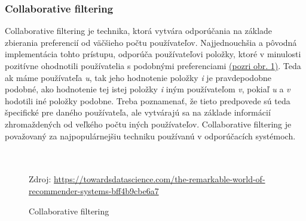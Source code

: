 \subsubsection{Collaborative filtering}
Collaborative filtering je technika, ktorá vytvára odporúčania na základe zbierania preferencií od väčšieho počtu používateľov. Najjednouchšia a pôvodná implementácia tohto prístupu, odporúča používateľovi položky, ktoré v minulosti pozitívne ohodnotili používatelia s podobnými preferenciami \hyperref[collaborativeFiltering]{(pozri obr. \ref{collaborativeFiltering})}. Teda ak máme používateľa  \textit{u}, tak jeho hodnotenie položky \textit{i} je pravdepodobne podobné, ako hodnotenie tej istej položky \textit{i} iným používateľom \textit{v}, pokiaľ \textit{u} a \textit{v} hodotili iné položky podobne. Treba poznamenať, že tieto predpovede sú teda špecifické pre daného používateľa, ale vytvárajú sa na základe informácií zhromaždených od veľkého počtu iných používateľov. Collaborative filtering je považovaný za najpopulárnejšiu techniku používanú v odporúčacích systémoch. \\\\\\


\begin{figure}[!htbp]
  \centering  
  \def\stackalignment{c}
           {\scriptsize%
            Zdroj: \url{https://towardsdatascience.com/the-remarkable-world-of-recommender-systems-bff4b9cbe6a7}}
  \caption{Collaborative filtering}
  
  \label{collaborativeFiltering}
\end{figure}

